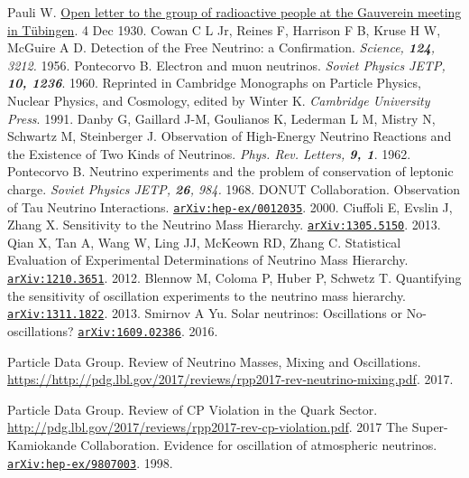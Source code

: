 \begin{thebibliography}{100}
	 Pauli W.
		\href{http://microboone-docdb.fnal.gov/cgi-bin/RetrieveFile?docid=953;filename=pauli\%20letter1930.pdf}{Open letter to the group of radioactive people at the 
Gauverein meeting in Tübingen}. 4 Dec 1930.
	 Cowan C L Jr, Reines F, Harrison F B, Kruse H W, McGuire A D.
		Detection of the Free Neutrino: a Confirmation. \textit{Science,
		\textbf{124}, 3212.} 1956.
	 Pontecorvo B. Electron and muon neutrinos.
		\textit{Soviet Physics JETP, \bf{10}, 1236}. 1960. Reprinted in
		Cambridge Monographs on Particle Physics, Nuclear Physics, and Cosmology,
		edited by Winter K. \textit{Cambridge University Press}. 1991.
	 Danby G, Gaillard J-M, Goulianos K, Lederman L M, Mistry N,
		Schwartz M, Steinberger J. Observation of High-Energy Neutrino Reactions
		and the Existence of Two Kinds of Neutrinos. \textit{Phys. Rev. Letters,
		\bf{9}, 1}. 1962.
	 Pontecorvo B. Neutrino experiments and the problem of
		conservation of leptonic charge. \textit{Soviet Physics JETP, \textbf{26},
		984.} 1968.
	 DONUT Collaboration. Observation of Tau Neutrino
		Interactions.
		\href{https://arxiv.org/abs/hep-ex/0012035}{\texttt{arXiv:hep-ex/0012035}}.
		2000.
	 Ciuffoli E, Evslin J, Zhang X. Sensitivity to the
		Neutrino Mass Hierarchy.
		\href{https://arxiv.org/abs/1305.5150v4}{\texttt{arXiv:1305.5150}}. 2013.
	 Qian X, Tan A, Wang W, Ling JJ, McKeown RD, Zhang C.
		Statistical Evaluation of Experimental Determinations of Neutrino Mass
		Hierarchy.
		\href{https://arxiv.org/abs/1210.3651}{\texttt{arXiv:1210.3651}}. 2012.
	 Blennow M, Coloma P, Huber P, Schwetz T. Quantifying the
		sensitivity of oscillation experiments to the neutrino mass hierarchy.
		\href{https://arxiv.org/pdf/1311.1822.pdf}{\texttt{arXiv:1311.1822}}. 2013.
	 Smirnov A Yu. Solar neutrinos: Oscillations or
		No-oscillations?
		\href{https://arxiv.org/abs/1609.02386}{\texttt{arXiv:1609.02386}}. 2016.

	 Particle Data Group. Review of Neutrino Masses, Mixing and
		Oscillations.
		\url{https://http://pdg.lbl.gov/2017/reviews/rpp2017-rev-neutrino-mixing.pdf}.
		2017.

	 Particle Data Group. Review of CP Violation in the Quark Sector.
		\url{http://pdg.lbl.gov/2017/reviews/rpp2017-rev-cp-violation.pdf}. 2017
	 The Super-Kamiokande Collaboration. Evidence for oscillation
		of atmospheric neutrinos.
		\href{https://arxiv.org/abs/hep-ex/9807003}{\texttt{arXiv:hep-ex/9807003}}. 1998.


\end{thebibliography}
